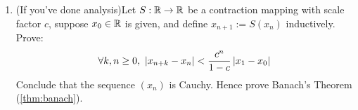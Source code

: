 \begin{exercises}
\begin{enumerate}
		
		\item\label{exs:banach} (If you've done analysis)\lstsp Let $S:\mathbb{R}\to\mathbb{R}$ be a contraction mapping with scale factor $c$, suppose $x_0\in\mathbb{R}$ is given, and define $x_{n+1}:=S(x_n)$ inductively. Prove:
		\[
			\forall k,n\ge 0,\ \nm{x_{n+k}-x_n}<\frac{c^n}{1-c}\nm{x_1-x_0}
		\]
		Conclude that the sequence $(x_n)$ is Cauchy. Hence prove Banach's Theorem (\ref{thm:banach}).
	\end{enumerate}
\end{exercises}